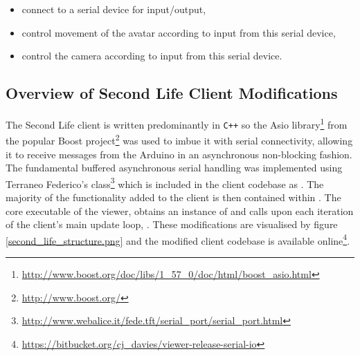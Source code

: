 \begin{itemize}
	\item connect to a serial device for input/output,
	\item control movement of the avatar according to input from this serial device,
	\item control the camera according to input from this serial device.
\end{itemize}


\subsection{Overview of Second Life Client Modifications}

\newcommand{\asioFootnote}{\footnote{\url{http://www.boost.org/doc/libs/1_57_0/doc/html/boost_asio.html}}}

\newcommand{\boostFootnote}{\footnote{\url{http://www.boost.org/}}}

\newcommand{\fedetftFootnote}{\footnote{\url{http://www.webalice.it/fede.tft/serial_port/serial_port.html}}}

\newcommand{\regionmodulelimitationFootnote}{\footnote{This is not due to any limitation on the part of OpenSim, but simply due to the Second Life client modifications being pursued further than the OpenSim module was.}}

\newcommand{\megaregionFootnote}{\footnote{\url{http://opensimulator.org/wiki/Setting_Up_Mega-Regions}}}



The Second Life client is written predominantly in \texttt{C++} so the Asio library\asioFootnote{} from the popular Boost project\boostFootnote{} was used to imbue it with serial connectivity, allowing it to receive messages from the Arduino in an asynchronous non-blocking fashion. The fundamental buffered asynchronous serial handling was implemented using Terraneo Federico's  class\fedetftFootnote{} which is included in the client codebase as . The majority of the functionality added to the client is then contained within . The core executable of the viewer,  obtains an instance of  and calls  upon each iteration of the client's main update loop, . These modifications are visualised by figure \ref{second_life_structure.png} and the modified client codebase is available online\footnote{\url{https://bitbucket.org/cj_davies/viewer-release-serial-io}}.

